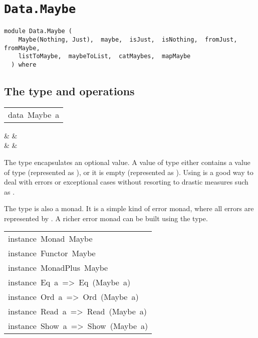\chapter{\texttt{Data.Maybe}}
\label{module:Data.Maybe}
\haddockbeginheader
{\haddockverb\begin{verbatim}
module Data.Maybe (
    Maybe(Nothing, Just),  maybe,  isJust,  isNothing,  fromJust,  fromMaybe, 
    listToMaybe,  maybeToList,  catMaybes,  mapMaybe
  ) where\end{verbatim}}
\haddockendheader

\section{The  type and operations
}
\begin{haddockdesc}
\item[\begin{tabular}{@{}l}
data\ Maybe\ a
\end{tabular}]\haddockbegindoc
\haddockbeginconstrs
\haddockdecltt{=} &  & \\
\haddockdecltt{|} &  & \\
\haddockendconstrs\par
The  type encapsulates an optional value.  A value of type
  either contains a value of type  (represented as ), 
 or it is empty (represented as ).  Using  is a good way to 
 deal with errors or exceptional cases without resorting to drastic
 measures such as .
\par
The  type is also a monad.  It is a simple kind of error
 monad, where all errors are represented by .  A richer
 error monad can be built using the  type.
\par

\end{haddockdesc}
\begin{haddockdesc}
\item[\begin{tabular}{@{}l}
instance\ Monad\ Maybe\\instance\ Functor\ Maybe\\instance\ MonadPlus\ Maybe\\instance\ Eq\ a\ =>\ Eq\ (Maybe\ a)\\instance\ Ord\ a\ =>\ Ord\ (Maybe\ a)\\instance\ Read\ a\ =>\ Read\ (Maybe\ a)\\instance\ Show\ a\ =>\ Show\ (Maybe\ a)
\end{tabular}]
\end{haddockdesc}

